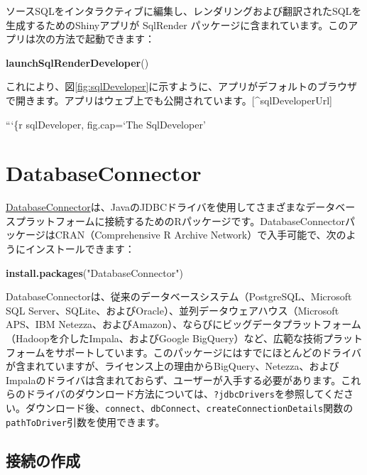 \documentclass[
  11pt]{book}
\newenvironment{Shaded}{\begin{snugshade}}{\end{snugshade}}
\newcommand{\FunctionTok}[1]{\textcolor[rgb]{0.13,0.29,0.53}{\textbf{#1}}}
\newcommand{\NormalTok}[1]{#1}
\newcommand{\StringTok}[1]{\textcolor[rgb]{0.31,0.60,0.02}{#1}}
\theoremstyle{definition}
\theoremstyle{definition}
\theoremstyle{definition}
\theoremstyle{definition}
\theoremstyle{remark}
\begin{document}
ソースSQLをインタラクティブに編集し、レンダリングおよび翻訳されたSQLを生成するためのShinyアプリが SqlRender パッケージに含まれています。このアプリは次の方法で起動できます：

\begin{Shaded}
\begin{Highlighting}[]
\FunctionTok{launchSqlRenderDeveloper}\NormalTok{()}
\end{Highlighting}
\end{Shaded}

これにより、図\ref{fig:sqlDeveloper}に示すように、アプリがデフォルトのブラウザで開きます。アプリはウェブ上でも公開されています。{[}\^{}sqlDeveloperUrl{]}

```\{r sqlDeveloper, fig.cap=`The SqlDeveloper'

\section{DatabaseConnector}\label{DatabaseConnector}

\href{https://ohdsi.github.io/DatabaseConnector/}{DatabaseConnector}は、JavaのJDBCドライバを使用してさまざまなデータベースプラットフォームに接続するためのRパッケージです。DatabaseConnectorパッケージはCRAN（Comprehensive R Archive Network）で入手可能で、次のようにインストールできます：

\begin{Shaded}
\begin{Highlighting}[]
\FunctionTok{install.packages}\NormalTok{(}\StringTok{"DatabaseConnector"}\NormalTok{)}
\end{Highlighting}
\end{Shaded}

DatabaseConnectorは、従来のデータベースシステム（PostgreSQL、Microsoft SQL Server、SQLite、およびOracle）、並列データウェアハウス（Microsoft APS、IBM Netezza、およびAmazon）、ならびにビッグデータプラットフォーム（Hadoopを介したImpala、およびGoogle BigQuery）など、広範な技術プラットフォームをサポートしています。このパッケージにはすでにほとんどのドライバが含まれていますが、ライセンス上の理由からBigQuery、Netezza、およびImpalaのドライバは含まれておらず、ユーザーが入手する必要があります。これらのドライバのダウンロード方法については、\texttt{?jdbcDrivers}を参照してください。ダウンロード後、\texttt{connect}、\texttt{dbConnect}、\texttt{createConnectionDetails}関数の\texttt{pathToDriver}引数を使用できます。

\subsection{接続の作成}\label{ux63a5ux7d9aux306eux4f5cux6210}
\end{document}
